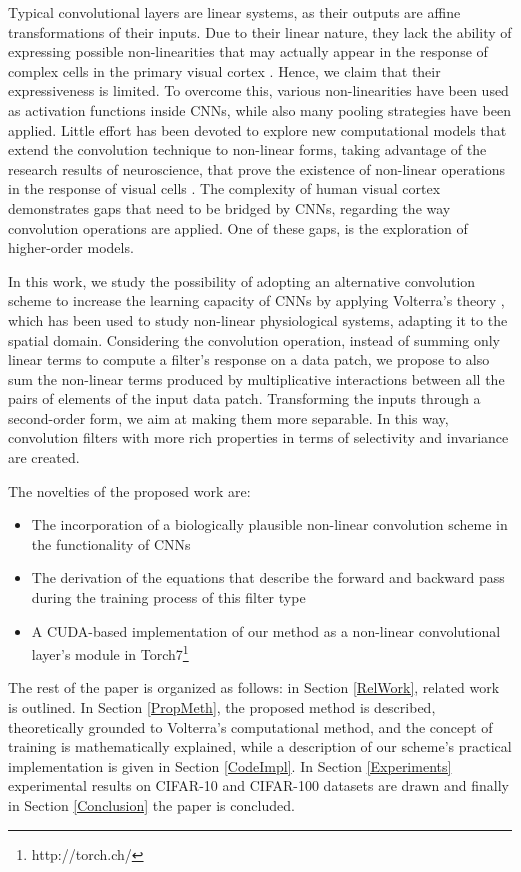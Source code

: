 \documentclass[10pt,twocolumn,letterpaper]{article}
\begin{document}
     Typical convolutional layers are linear systems, as their outputs are affine transformations of their inputs. Due to their linear nature, they lack the ability of expressing possible non-linearities that may actually appear in the response of complex cells in the primary visual cortex \cite{Rapela06}. Hence, we claim that their expressiveness is limited. To overcome this, various non-linearities have been used as activation functions inside CNNs, while also many pooling strategies have been applied. Little effort has been devoted to explore new computational models that extend the convolution technique to non-linear forms, taking advantage of the research results of neuroscience, that prove the existence of non-linear operations in the response of visual cells \cite{Szulborski90}\cite{Niell08}. The complexity of human visual cortex demonstrates gaps that need to be bridged by CNNs, regarding the way convolution operations are applied. One of these gaps, is the exploration of higher-order models.
     
     In this work, we study the possibility of adopting an alternative convolution scheme to increase the learning capacity of CNNs by applying Volterra's theory \cite{Volterra30}, which has been used to study non-linear physiological systems, adapting it to the spatial domain. Considering the convolution operation, instead of summing only linear terms to compute a filter's response on a data patch, we propose to also sum the non-linear terms produced by multiplicative interactions between all the pairs of elements of the input data patch. Transforming the inputs through a second-order form, we aim at making them more separable. In this way, convolution filters with more rich properties in terms of selectivity and invariance are created.
     
     The novelties of the proposed work are:
     \begin{itemize}
        \item The incorporation of a biologically plausible non-linear convolution scheme in the functionality of CNNs
        \item The derivation of the equations that describe the forward and backward pass during the training process of this filter type
        \item A CUDA-based implementation of our method as a non-linear convolutional layer's module in Torch7\footnote{http://torch.ch/}\cite{torch7}
     \end{itemize}

     The rest of the paper is organized as follows: in Section \ref{RelWork}, related work is outlined. In Section \ref{PropMeth}, the proposed method is described, theoretically grounded to Volterra's computational method, and the concept of training is mathematically explained, while a description of our scheme's practical implementation is given in Section \ref{CodeImpl}. In Section \ref{Experiments} experimental results on CIFAR-10 and CIFAR-100 datasets are drawn and finally in Section \ref{Conclusion} the paper is concluded.
\end{document}
